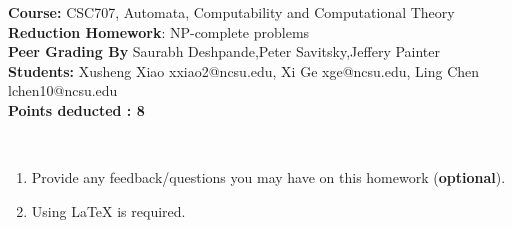 \documentclass{article}%
\begin{document}
\begin{flushleft}
\textbf{Course:} CSC707, Automata, Computability and Computational Theory \\
\textbf{Reduction Homework}: NP-complete problems \\
\textbf{Peer Grading By} Saurabh Deshpande,Peter Savitsky,Jeffery Painter  \\
\textbf{Students:} Xusheng Xiao xxiao2@ncsu.edu, Xi Ge xge@ncsu.edu, Ling Chen lchen10@ncsu.edu \\
\textbf{Points deducted : 8 }
\end{flushleft}

\begin{center}
\\
\begin{enumerate}
	\item Provide any feedback/questions you may have on this homework (\textbf{optional}).
	\item Using LaTeX is required.
\end{enumerate}\end{center}

\noindent{\hrulefill}

\bigskip
\end{document}
